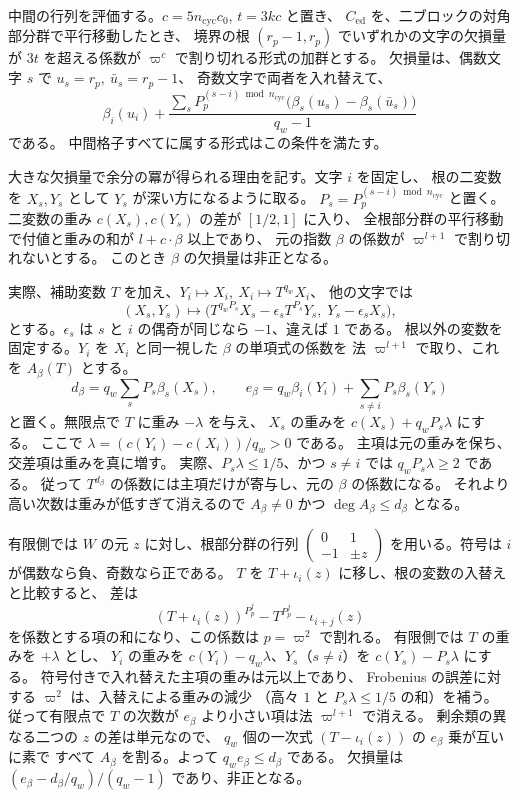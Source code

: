 中間の行列を評価する。\(c=5n_\mathrm{cyc}c_0\), \(t=3kc\) と置き、
\(C_\mathrm{ed}\) を、二ブロックの対角部分群で平行移動したとき、
境界の根 \((r_p-1,r_p)\) でいずれかの文字の欠損量が \(3t\) を超える係数が
\(\varpi^c\) で割り切れる形式の加群とする。
欠損量は、偶数文字 \(s\) で \(u_s=r_p,\ \bar u_s=r_p-1\)、
奇数文字で両者を入れ替えて、
\[
 \beta_i(u_i)+\frac{\displaystyle\sum_s
   P_p^{(s-i)\bmod n_\mathrm{cyc}}\bigl(\beta_s(u_s)-\beta_s(\bar u_s)\bigr)}
                      {q_w-1}
\]
である。
中間格子すべてに属する形式はこの条件を満たす。

大きな欠損量で余分の冪が得られる理由を記す。文字 \(i\) を固定し、
根の二変数を \(X_s,Y_s\) として \(Y_s\) が深い方になるように取る。
\(P_s=P_p^{(s-i)\bmod n_\mathrm{cyc}}\) と置く。
二変数の重み \(c(X_s),c(Y_s)\) の差が \([1/2,1]\) に入り、
全根部分群の平行移動で付値と重みの和が \(l+c\cdot\beta\) 以上であり、
元の指数 \(\beta\) の係数が \(\varpi^{l+1}\) で割り切れないとする。
このとき \(\beta\) の欠損量は非正となる。

実際、補助変数 \(T\) を加え、\(Y_i\mapsto X_i,\ X_i\mapsto T^{q_w}X_i\)、
他の文字では
\[
 (X_s,Y_s)\longmapsto
 \bigl(T^{q_wP_s}X_s-\epsilon_s T^{P_s}Y_s,\;
                  Y_s-\epsilon_s X_s\bigr),
\]
とする。\(\epsilon_s\) は \(s\) と \(i\) の偶奇が同じなら \(-1\)、違えば \(1\) である。
根以外の変数を固定する。\(Y_i\) を \(X_i\) と同一視した \(\beta\) の単項式の係数を
法 \(\varpi^{l+1}\) で取り、これを \(A_\beta(T)\) とする。
\[
 d_\beta=q_w\sum_sP_s\beta_s(X_s),\qquad
 e_\beta=q_w\beta_i(Y_i)+\sum_{s\ne i}P_s\beta_s(Y_s)
\]
と置く。無限点で \(T\) に重み \(-\lambda\) を与え、
\(X_s\) の重みを \(c(X_s)+q_wP_s\lambda\) にする。
ここで \(\lambda=(c(Y_i)-c(X_i))/q_w>0\) である。
主項は元の重みを保ち、交差項は重みを真に増す。
実際、\(P_s\lambda\le1/5\)、かつ \(s\ne i\) では \(q_wP_s\lambda\ge2\) である。
従って \(T^{d_\beta}\) の係数には主項だけが寄与し、元の \(\beta\) の係数になる。
それより高い次数は重みが低すぎて消えるので
\(A_\beta\ne0\) かつ \(\deg A_\beta\le d_\beta\) となる。

有限側では \(W\) の元 \(z\) に対し、根部分群の行列
\(\left(\begin{smallmatrix}0&1\\-1&\pm z\end{smallmatrix}\right)\)
を用いる。符号は \(i\) が偶数なら負、奇数なら正である。
\(T\) を \(T+\iota_i(z)\) に移し、根の変数の入替えと比較すると、
差は
\[
 (T+\iota_i(z))^{P_p^j}-T^{P_p^j}-\iota_{i+j}(z)
\]
を係数とする項の和になり、この係数は \(p=\varpi^2\) で割れる。
有限側では \(T\) の重みを \(+\lambda\) とし、
\(Y_i\) の重みを \(c(Y_i)-q_w\lambda\)、\(Y_s\)（\(s\ne i\)）を
\(c(Y_s)-P_s\lambda\) にする。
符号付きで入れ替えた主項の重みは元以上であり、
Frobenius の誤差に対する \(\varpi^2\) は、入替えによる重みの減少
（高々 \(1\) と \(P_s\lambda\le1/5\) の和）を補う。
従って有限点で \(T\) の次数が \(e_\beta\) より小さい項は法 \(\varpi^{l+1}\) で消える。
剰余類の異なる二つの \(z\) の差は単元なので、
\(q_w\) 個の一次式 \((T-\iota_i(z))\) の \(e_\beta\) 乗が互いに素で
すべて \(A_\beta\) を割る。よって \(q_we_\beta\le d_\beta\) である。
欠損量は \((e_\beta-d_\beta/q_w)/(q_w-1)\) であり、非正となる。

